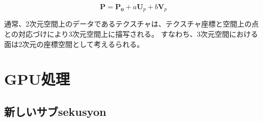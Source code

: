 \begin{equation}
\bm{P} = \bm{P_0} + a\bm{U}_{p} + b\bm{V}_{p}
\end{equation}

通常、2次元空間上のデータであるテクスチャは、テクスチャ座標と空間上の点との対応づけにより3次元空間上に描写される。
すなわち、3次元空間における面は2次元の座標空間として考えるられる\figref{}。





\section{GPU処理}
\label{SGpumethod}

\subsection{新しいサブsekusyon}
\label{SS}
